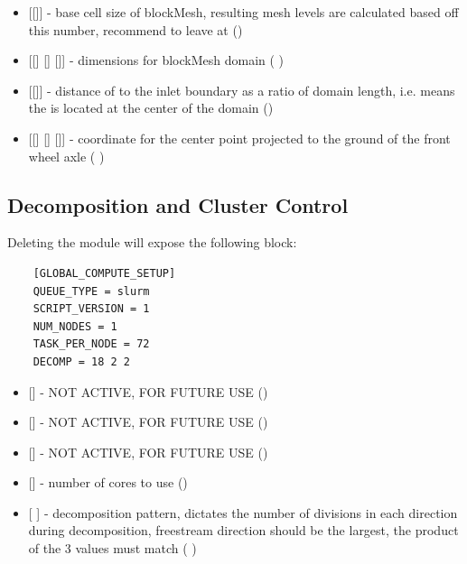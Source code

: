\begin{itemize}
    \item {} [[]] - base cell size of blockMesh, resulting mesh levels are calculated based off this number, recommend to leave at  ()
    
    \item {} [[] [] []] - dimensions for blockMesh domain (  )
    
    \item {} [[]] - distance of  to the inlet boundary as a ratio of domain  length, i.e.  means the  is located at the center of the domain ()
    
    \item {} [[] [] []] - coordinate for the center point projected to the ground of the front wheel axle (  )
    

\end{itemize}


\subsection{Decomposition and Cluster Control}
Deleting the module  will expose the following block:
\begin{lstlisting}
    [GLOBAL_COMPUTE_SETUP]
    QUEUE_TYPE = slurm
    SCRIPT_VERSION = 1
    NUM_NODES = 1
    TASK_PER_NODE = 72
    DECOMP = 18 2 2
\end{lstlisting}

\begin{itemize}
    \item {} [] - NOT ACTIVE, FOR FUTURE USE ()
    
    \item {} [] - NOT ACTIVE, FOR FUTURE USE ()
    
    \item {} [] - NOT ACTIVE, FOR FUTURE USE ()
    
    \item {} [] - number of cores to use ()
    
    \item {} [  ] - decomposition pattern, dictates the number of divisions in each direction during decomposition, freestream direction should be the largest, the product of the 3 values must match  (  )
\end{itemize}


